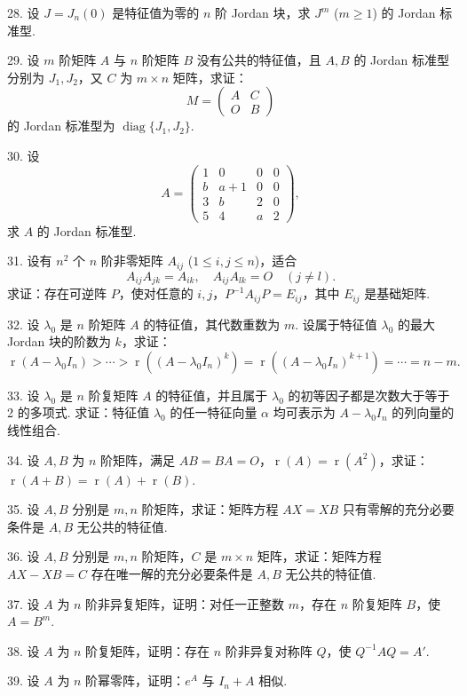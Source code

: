 \documentclass[UTF8, 12pt, fontset=fandol, oneside]{ctexart}
\begin{document}
28. 设 $J=J_n(0)$ 是特征值为零的 $n$ 阶 Jordan 块，求 $J^m$ ($m\geq 1$) 的 Jordan 标准型.

29. 设 $m$ 阶矩阵 $A$ 与 $n$ 阶矩阵 $B$ 没有公共的特征值，且 $A,B$ 的 Jordan 标准型分别为 $J_1,J_2$，又 $C$ 为 $m\times n$ 矩阵，求证：
\[
M=\left(\begin{array}{cc}
A & C\\
O & B
\end{array}\right)
\]
的 Jordan 标准型为 $\operatorname{diag}\{J_1,J_2\}$.

30. 设
\[
A=\left(\begin{array}{cccc}
1 & 0 & 0 & 0\\
b & a+1 & 0 & 0\\
3 & b & 2 & 0\\
5 & 4 & a & 2
\end{array}\right),
\]
求 $A$ 的 Jordan 标准型.

31. 设有 $n^2$ 个 $n$ 阶非零矩阵 $A_{ij}$ ($1\leq i,j\leq n$)，适合
\[
A_{ij}A_{jk}=A_{ik},\quad A_{ij}A_{lk}=O\quad (j\ne l).
\]
求证：存在可逆阵 $P$，使对任意的 $i,j$，$P^{-1}A_{ij}P=E_{ij}$，其中 $E_{ij}$ 是基础矩阵.

32. 设 $\lambda_0$ 是 $n$ 阶矩阵 $A$ 的特征值，其代数重数为 $m$. 设属于特征值 $\lambda_0$ 的最大 Jordan 块的阶数为 $k$，求证：
\[
\operatorname{r}(A-\lambda_0I_n)>\cdots>\operatorname{r}((A-\lambda_0I_n)^k)=\operatorname{r}((A-\lambda_0I_n)^{k+1})=\cdots=n-m.
\]

33. 设 $\lambda_0$ 是 $n$ 阶复矩阵 $A$ 的特征值，并且属于 $\lambda_0$ 的初等因子都是次数大于等于 2 的多项式. 求证：特征值 $\lambda_0$ 的任一特征向量 $\alpha$ 均可表示为 $A-\lambda_0I_n$ 的列向量的线性组合.

34. 设 $A,B$ 为 $n$ 阶矩阵，满足 $AB=BA=O$，$\operatorname{r}(A)=\operatorname{r}(A^2)$，求证：$\operatorname{r}(A+B)=\operatorname{r}(A)+\operatorname{r}(B)$.

35. 设 $A,B$ 分别是 $m,n$ 阶矩阵，求证：矩阵方程 $AX=XB$ 只有零解的充分必要条件是 $A,B$ 无公共的特征值.

36. 设 $A,B$ 分别是 $m,n$ 阶矩阵，$C$ 是 $m\times n$ 矩阵，求证：矩阵方程 $AX-XB=C$ 存在唯一解的充分必要条件是 $A,B$ 无公共的特征值.

37. 设 $A$ 为 $n$ 阶非异复矩阵，证明：对任一正整数 $m$，存在 $n$ 阶复矩阵 $B$，使 $A=B^m$.

38. 设 $A$ 为 $n$ 阶复矩阵，证明：存在 $n$ 阶非异复对称阵 $Q$，使 $Q^{-1}AQ=A'$.

39. 设 $A$ 为 $n$ 阶幂零阵，证明：$e^A$ 与 $I_n+A$ 相似.
\end{document}
